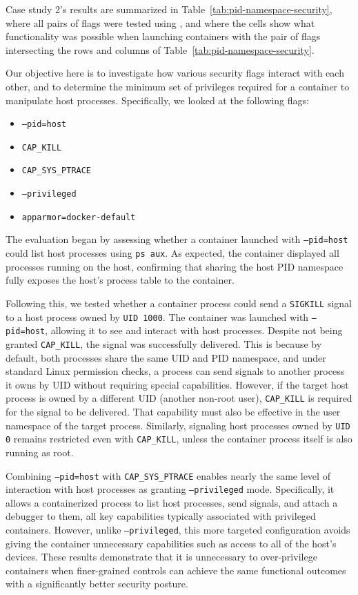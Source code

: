 Case study 2's results are summarized in Table~\ref{tab:pid-namespace-security}, where all pairs of flags were tested using \houdini, and where the cells show what functionality was possible when launching containers with the pair of flags intersecting the rows and columns of Table~\ref{tab:pid-namespace-security}. 

Our objective here is to investigate how various security flags interact with each other, and to determine the minimum set of privileges required for a container to manipulate host processes. Specifically, we looked at the following flags:

\begin{itemize}
    \item \texttt{--pid=host}
    \item \texttt{CAP\_KILL}
    \item \texttt{CAP\_SYS\_PTRACE}
    \item \texttt{--privileged}
    \item \texttt{apparmor=docker-default}
\end{itemize}

The evaluation began by assessing whether a container launched with \texttt{--pid=host} could list host processes using \texttt{ps aux}. As expected, the container displayed all processes running on the host, confirming that sharing the host PID namespace fully exposes the host's process table to the container.

Following this, we tested whether a container process could send a \texttt{SIGKILL} signal to a host process owned by \texttt{UID 1000}. The container was launched with \texttt{--pid=host}, allowing it to see and interact with host processes. Despite not being granted \texttt{CAP\_KILL}, the signal was successfully delivered. This is because by default, both processes share the same UID and PID namespace, and under standard Linux permission checks, a process can send signals to another process it owns by UID without requiring special capabilities. However, if the target host process is owned by a different UID (another non-root user), \texttt{CAP\_KILL} is required for the signal to be delivered. That capability must also be effective in the user namespace of the target process. Similarly, signaling host processes owned by \texttt{UID 0} remains restricted even with \texttt{CAP\_KILL}, unless the container process itself is also running as root.

Combining \texttt{--pid=host} with \texttt{CAP\_SYS\_PTRACE} enables nearly the same level of interaction with host processes as granting \texttt{--privileged} mode. Specifically, it allows a containerized process to list host processes, send signals, and attach a debugger to them, all key capabilities typically associated with privileged containers. However, unlike \texttt{--privileged}, this more targeted configuration avoids giving the container unnecessary capabilities such as access to all of the host's devices. These results demonstrate that it is unnecessary to over-privilege containers when finer-grained controls can achieve the same functional outcomes with a significantly better security posture.

